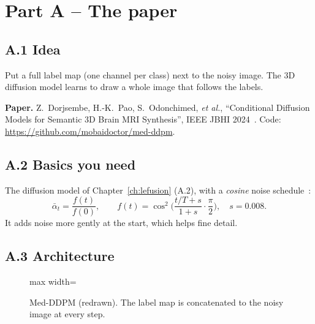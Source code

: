 \documentclass[11pt,a4paper,oneside]{report}
\newcommand{\x}{\bm{x}}
\newcommand{\eps}{\bm{\epsilon}}
\newcommand{\abar}{\bar{\alpha}}
\begin{document}
\section{Part A -- The paper}

\subsection*{A.1 Idea}
\begin{idea}
Put a full label map (one channel per class) next to the noisy image. The 3D diffusion model learns to draw a whole image that follows the labels.
\end{idea}
\textbf{Paper.} Z.~Dorjsembe, H.-K.~Pao, S.~Odonchimed, \emph{et al.}, ``Conditional Diffusion Models for Semantic 3D Brain MRI Synthesis'', IEEE JBHI 2024~\cite{dorjsembe2024medddpm}. Code: \url{https://github.com/mobaidoctor/med-ddpm}.

\subsection*{A.2 Basics you need}
The diffusion model of Chapter~\ref{ch:lefusion} (A.2), with a \emph{cosine} noise schedule~\cite{nichol2021}:
\begin{equation}
\abar_t=\frac{f(t)}{f(0)},\qquad f(t)=\cos^2\!\Big(\frac{t/T+s}{1+s}\cdot\frac{\pi}{2}\Big),\quad s=0.008 .
\end{equation}
It adds noise more gently at the start, which helps fine detail.

\subsection*{A.3 Architecture}
\begin{figure}[H]
\centering
\begin{adjustbox}{max width=\linewidth}
\end{adjustbox}
\caption{Med-DDPM (redrawn). The label map is concatenated to the noisy image at every step.}
\end{figure}
\end{document}
